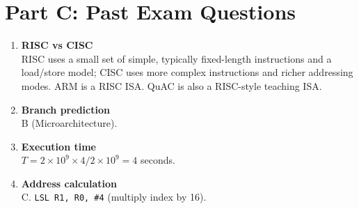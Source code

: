 \documentclass[11pt]{article}
\begin{document}
\section*{Part C: Past Exam Questions}
\begin{enumerate}[label=\textbf{C\arabic*.}]
  \item \textbf{RISC vs CISC}\\
  RISC uses a small set of simple, typically fixed-length instructions and a load/store model; CISC uses more complex instructions and richer addressing modes. ARM is a RISC ISA. QuAC is also a RISC-style teaching ISA.

  \item \textbf{Branch prediction}\\
  B (Microarchitecture).

  \item \textbf{Execution time}\\
  $T = 2\times 10^9 \times 4 / 2\times 10^9 = 4$ seconds.

  \item \textbf{Address calculation}\\
  C. \texttt{LSL R1, R0, \#4} (multiply index by 16).
\end{enumerate}
\end{document}
